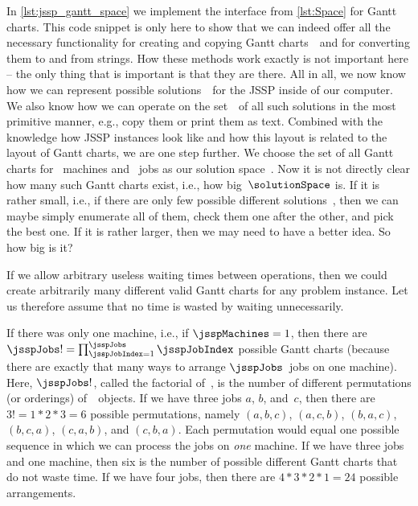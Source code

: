 In \autoref{lst:jssp_gantt_space} we implement the  interface from \autoref{lst:Space} for Gantt charts.
This code snippet is only here to show that we can indeed offer all the necessary functionality for creating and copying Gantt charts~\solspel\ and for converting them to and from strings.
How these methods work exactly is not important here -- the only thing that is important is that they are there.
All in all, we now know how we can represent possible solutions~\solspel\ for the \gls{JSSP} inside of our computer.
We also know how we can operate on the set~\solutionSpace\ of all such solutions in the most primitive manner, e.g., copy them or print them as text.
Combined with the knowledge how \gls{JSSP} instances look like and how this layout is related to the layout of Gantt charts, we are one step further.%
%
\endhsection%
%
%
\label{sec:solutionSpace:size}%
%
We choose the set of all Gantt charts for \jsspMachines~machines and \jsspJobs~jobs as our solution space~\solutionSpace.
Now it is not directly clear how many such Gantt charts exist, i.e., how big~$\solutionSpace$ is.
If it is rather small, i.e., if there are only few possible different solutions~\solspel, then we can maybe simply enumerate all of them, check them one after the other, and pick the best one.
If it is rather larger, then we may need to have a better idea.
So how big is it?

If we allow arbitrary useless waiting times between operations, then we could create arbitrarily many different valid Gantt charts for any problem instance.
Let us therefore assume that no time is wasted by waiting unnecessarily.

If there was only one machine, i.e., if $\jsspMachines=1$, then there are~$\jsspJobs!=\prod_{\jsspJobIndex=1}^{\jsspJobs} \jsspJobIndex$ possible Gantt charts (because there are exactly that many ways to arrange $\jsspJobs$~jobs on one machine).
Here, $\jsspJobs!$, called the factorial of~\jsspJobs, is the number of different permutations (or orderings) of~\jsspJobs\ objects.
If we have three jobs $a$, $b$, and~$c$, then there are $3!=1*2*3=6$ possible permutations, namely $(a,b,c)$, $(a,c,b)$, $(b,a,c)$, $(b, c, a)$, $(c, a, b)$, and $(c, b, a)$.
Each permutation would equal one possible sequence in which we can process the jobs on \emph{one} machine.
If we have three jobs and one machine, then six is the number of possible different Gantt charts that do not waste time.
If we have four jobs, then there are $4*3*2*1=24$ possible arrangements.

